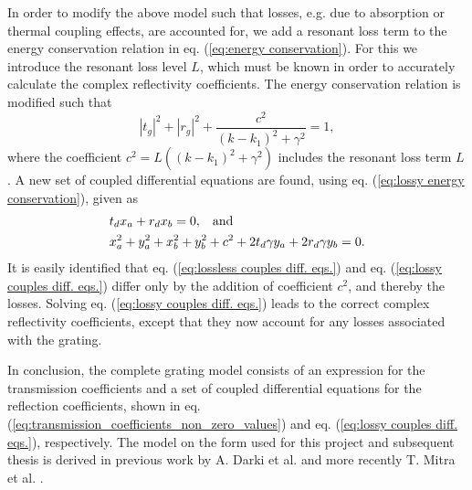 In order to modify the above model such that losses, e.g. due to absorption or thermal coupling effects, are accounted for, we add a resonant loss term to the energy conservation relation in eq. (\ref{eq:energy conservation}). For this we introduce the resonant loss level $L$, which must be known in order to accurately calculate the complex reflectivity coefficients. The energy conservation relation is modified such that
\begin{equation}
    |t_g|^2 + |r_g|^2 + \frac{c^2}{(k - k_1)^2 + \gamma^2} = 1,
    \label{eq:lossy energy conservation}
\end{equation}
where the coefficient $c^2 = L((k-k_1)^2 + \gamma^2)$ includes the resonant loss term $L$. A new set of coupled differential equations are found, using eq. (\ref{eq:lossy energy conservation}), given as
\begin{equation}
    \begin{split}
        &t_d x_a + r_d x_b = 0, \hspace{0.3cm} \text{and} \\
        &x_a^2 + y_a^2 + x_b^2 + y_b^2 + c^2 +  2 t_d \gamma y_a + 2 r_d \gamma y_b = 0.
    \end{split}
    \label{eq:lossy couples diff. eqs.}
\end{equation}
It is easily identified that eq. (\ref{eq:lossless couples diff. eqs.}) and eq. (\ref{eq:lossy couples diff. eqs.}) differ only by the addition of coefficient $c^2$, and thereby the losses. Solving eq. (\ref{eq:lossy couples diff. eqs.}) leads to the correct complex reflectivity coefficients, except that they now account for any losses associated with the grating. 

In conclusion, the complete grating model consists of an expression for the transmission coefficients and a set of coupled differential equations for the reflection coefficients, shown in eq. (\ref{eq:transmission_coefficients_non_zero_values}) and eq. (\ref{eq:lossy couples diff. eqs.}), respectively. The model on the form used for this project and subsequent thesis is derived in previous work by A. Darki et al. \cite{Darki} and more recently T. Mitra et al. \cite{Mitra}.

